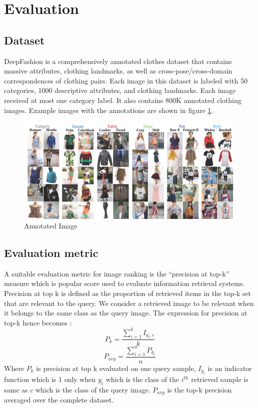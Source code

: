 \section{Evaluation}

\subsection{Dataset}
DeepFashion \cite{liu2016deepfashion} is a comprehensively annotated clothes dataset that contains massive attributes, clothing landmarks, as well as cross-pose/cross-domain correspondences of clothing pairs. Each image in this
dataset is labeled with 50 categories, 1000 descriptive attributes, and clothing landmarks. Each image received at most one category label. It also contains 800K annotated clothing images. Example images with the annotations are shown in figure \ref{fig:dataset}.


\begin{figure}[tph!]
\centerline{\includegraphics[totalheight=6cm]{imgs/img2.jpg}}
    \caption{Annotated Image}
    \label{fig:dataset}
\end{figure}

\subsection{Evaluation metric}

A suitable evaluation metric for image ranking is the ``precision at top-k'' measure which is popular score used to evaluate information retrieval systems. Precision at top k is defined as the proportion of retrieved items in the top-k set that are relevant to the query. We consider a retrieved image to be relevant when it belongs to the same class as the query image. The expression for precision at top-k hence becomes :
\begin{equation}\label{eqn3}
P_{k} = \frac{\sum_{i=1}^{k} I_{y_i, c}}{k}
\end{equation}
\begin{equation}\label{eqn3}
P_{avg} = \frac{\sum_{i=1}^{n} P_{k_i}}{n}
\end{equation}
Where $P_k$ is precision at top k evaluated on one query sample, $I_{y_i}$ is an indicator function which is 1 only when $y_i$ which is the class of the $i^{th}$ retrieved sample is same as $c$ which is the class of the query image. $P_{avg}$ is the top-k precision averaged over the complete dataset.

